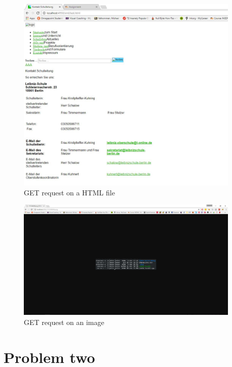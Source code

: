 \documentclass[a4paper,12pt]{article}
\numberwithin{figure}{section}
\begin{document}
\begin{figure}[hp!]
	\centering
	\label{HTML}
	\includegraphics[width=0.95\textwidth,keepaspectratio]{img/HTMLFile.jpg} 
	\caption{GET request on a HTML file}
\end{figure}

\begin{figure}[hp!]
	\centering
	\label{PNG}
	\includegraphics[width=0.95\textwidth,keepaspectratio]{img/PNGFile.jpg} 
	\caption{GET request on an image}
\end{figure}

\newpage
\section{Problem two}
\end{document}
